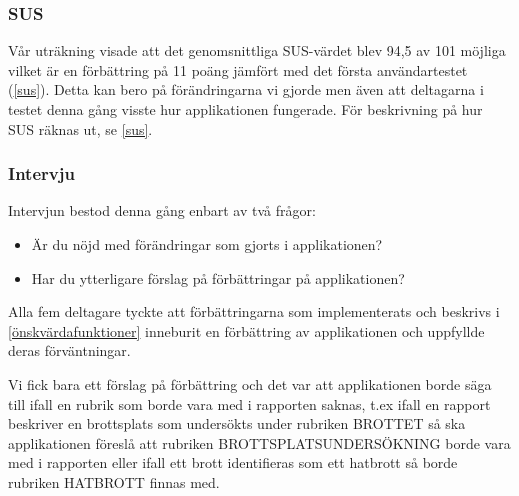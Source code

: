 \documentclass[swedish]{maucsthesis}
\begin{document}
\subsubsection{SUS}

Vår uträkning visade att det genomsnittliga SUS-värdet blev 94,5 av 101 möjliga
vilket är en förbättring på 11 poäng jämfört med det första användartestet
(\cref{sus}). Detta kan bero på förändringarna vi gjorde men även att deltagarna
i testet denna gång visste hur applikationen fungerade. För beskrivning på hur
SUS räknas ut, se \cref{sus}.


\subsubsection{Intervju}

Intervjun bestod denna gång enbart av två frågor:

\begin{itemize}
\item Är du nöjd med förändringar som gjorts i applikationen?
\item Har du ytterligare förslag på förbättringar på applikationen?
\end{itemize}

Alla fem deltagare tyckte att förbättringarna som implementerats och beskrivs i
\cref{önskvärdafunktioner} inneburit en förbättring av applikationen och
uppfyllde deras förväntningar.

Vi fick bara ett förslag på förbättring och det var att applikationen borde säga
till ifall en rubrik som borde vara med i rapporten saknas, t.ex ifall en
rapport beskriver en brottsplats som undersökts under rubriken BROTTET så ska
applikationen föreslå att rubriken BROTTSPLATSUNDERSÖKNING borde vara med i
rapporten eller ifall ett brott identifieras som ett hatbrott så borde rubriken
HATBROTT finnas med.
\end{document}
